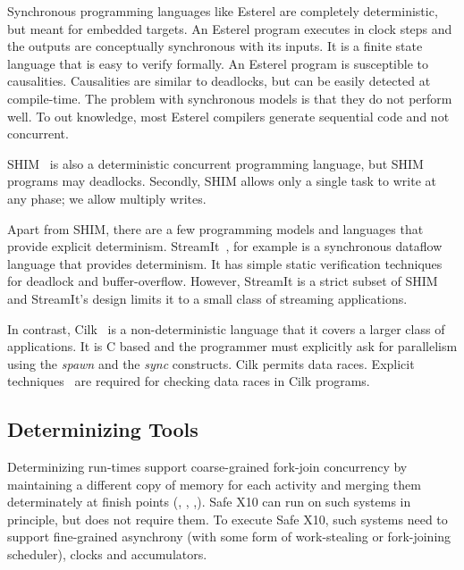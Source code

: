 Synchronous programming languages like Esterel are completely
deterministic, but meant for embedded targets. An Esterel program
executes in clock steps and the outputs are conceptually synchronous
with its inputs.  It is a finite state language that is easy to verify
formally. An Esterel program is susceptible to
causalities. Causalities are similar to deadlocks, but can be easily
detected at compile-time.  The problem with synchronous models is that
they do not perform well. To out knowledge, most Esterel compilers
generate sequential code and not concurrent.
 
SHIM~\cite{edwards2005shim2,tardieu2006scheduling-independent} is also
a deterministic concurrent programming language, but SHIM programs may
deadlocks.  Secondly, SHIM allows only a single task to write at any
phase; we allow multiply writes.

Apart from SHIM, there are a few programming models and languages that
provide explicit determinism. StreamIt~\cite{thies2001streamit}, for
example is a synchronous dataflow language that provides
determinism. It has simple static verification techniques for deadlock
and buffer-overflow.  However, StreamIt is a strict subset of SHIM and
StreamIt's design limits it to a small class of streaming
applications.
 


In contrast, 
Cilk~\cite{blumofe1995cilk} is a non-deterministic language that it covers a larger
class of applications. It is C based
and the programmer must explicitly ask for parallelism using 
the \emph{spawn} and the \emph{sync} constructs. 
Cilk permits data races.
Explicit techniques~\cite{cheng1998detecting} are
required for checking data races in Cilk programs.  




\subsection{Determinizing Tools} 
Determinizing run-times support coarse-grained fork-join concurrency
by maintaining a different copy of memory for each activity and
merging them determinately at finish points (\cite{grace},
\cite{dmp}, \cite{kendo},\cite{determinator}). Safe
X10 can run on such systems in principle, but does not require them.
To execute Safe X10, such systems need to support fine-grained
asynchrony (with some form of work-stealing or fork-joining
scheduler), clocks and accumulators.

